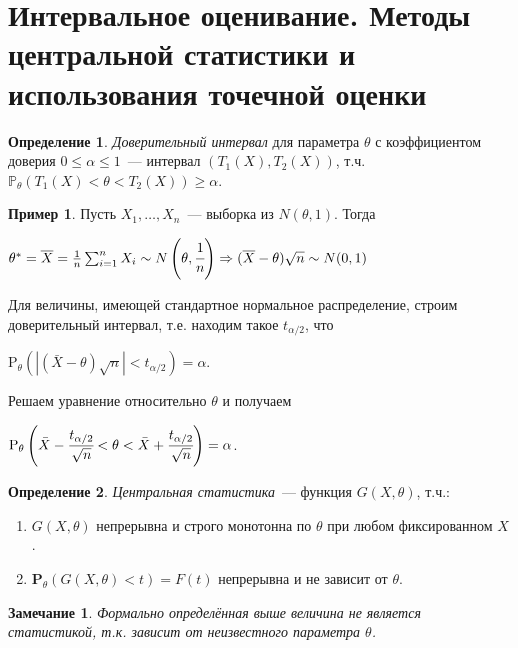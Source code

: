 \documentclass[oneside,final,14pt]{extreport}
\newtheorem*{rmrk}{Замечание}
\theoremstyle{definition}
\newtheorem{defn}{Определение}[section]
\newtheorem*{exmp}{Пример}
\begin{document}
\section{Интервальное оценивание. Методы центральной статистики и использования точечной оценки}

\begin{defn}
{\it Доверительный интервал} для параметра \(\theta\) с коэффициентом доверия \(0 \leq \alpha \leq 1\)~--- интервал \((T_1(X), T_2(X))\), т.ч. \(\mathbb{P}_{\theta}(T_1(X) < \theta < T_2(X)) \geq \alpha\).
\end{defn}

\begin{exmp}
Пусть \(X_1, \ldots, X_n\)~--- выборка из \(N(\theta, 1)\). Тогда

\( \theta^{*}=\overline{X}=\frac{1}{n} \sum_{i=1}^{n} X_{i} \sim N\left(\theta, \cfrac{1}{n}\right) \Rightarrow (\overline{X}-\theta) \sqrt{n} \sim N(0,1)\)

Для величины, имеющей стандартное нормальное распределение, строим доверительный интервал, т.е. находим такое \(t_{\alpha / 2} \), что 

\( \mathrm{P}_{\theta}\left(|(\bar{X}-\theta) \sqrt{n}|<t_{\alpha / 2}\right)=\alpha \).

Решаем уравнение относительно \(\theta\) и получаем

\( \mathrm{P}_{\theta}\left(\bar{X}-\cfrac{t_{\alpha / 2}}{\sqrt{n}}<\theta<\bar{X}+\cfrac{t_{\alpha / 2}}{\sqrt{n}}\right)=\alpha \).
\end{exmp}

\begin{defn}
{\it Центральная статистика}~--- функция \(G(X,\theta)\), т.ч.:
\begin{enumerate}
    \item \(G(X,\theta)\) непрерывна и строго монотонна по \(\theta\) при любом фиксированном \(X\).
    \item \(\mathbf{P}_{\theta}(G(X, \theta)<t)=F(t)\) непрерывна и не зависит от \(\theta\).
\end{enumerate}
\end{defn}

\begin{rmrk}
Формально определённая выше величина не является статистикой, т.к. зависит от неизвестного параметра \(\theta\).
\end{rmrk}
\end{document}
